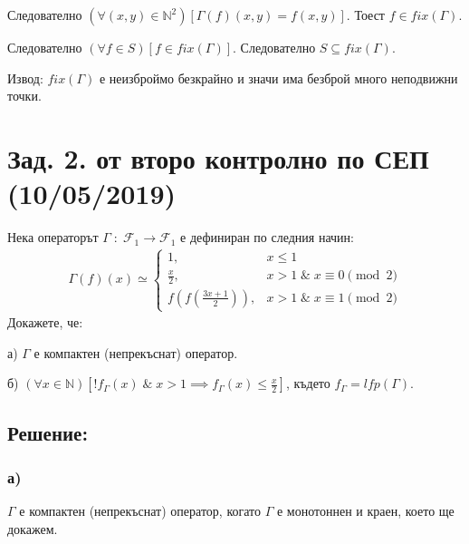 \documentclass{article}
\begin{document}
Следователно \((\forall (x, y) \in \mathbb{N}^2)[\Gamma(f)(x, y) = f(x, y)]\).
Тоест \(f \in fix(\Gamma)\). 

Следователно \((\forall f \in S)[f \in fix(\Gamma)]\). Следователно \(S \subseteq fix(\Gamma)\).

Извод: \(fix(\Gamma)\) е неизброймо безкрайно и значи има безброй много неподвижни точки.

\section*{Зад. 2. от второ контролно по СЕП (10/05/2019)}
Нека операторът \(\Gamma \; : \; \mathcal{F}_1 \to \mathcal{F}_1\)
е дефиниран по следния начин:
\begin{align*}
\Gamma(f)(x) \simeq \begin{cases}
    1, & x \leq 1 \\
    \displaystyle\frac{x}{2}, & x > 1 \; \& \; x \equiv 0 \pmod{2}\\
    \displaystyle{f\left(f\left(\frac{3x + 1}{2}\right)\right)}, & x > 1 \; \& \; x \equiv 1 \pmod{2}
\end{cases}    
\end{align*}
Докажете, че:

а) \(\Gamma\) е компактен (непрекъснат) оператор.

б) \((\forall x \in \mathbb{N})\left[!f_\Gamma(x) \; \& \; x > 1 \implies f_\Gamma(x) \leq \displaystyle\frac{x}{2}\right]\), където \(f_\Gamma = lfp(\Gamma)\).
\subsection*{Решение:}
\subsubsection*{а)}
\(\Gamma\) е компактен (непрекъснат) оператор, когато \(\Gamma\) е монотоннен и краен, което ще докажем.
\end{document}
